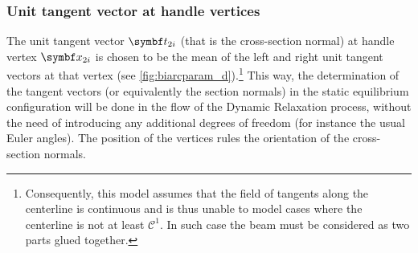 \subsubsection{Unit tangent vector at handle vertices}
The unit tangent vector $\vect{t}_{2i}$ (that is the cross-section normal) at handle vertex $\vect{x}_{2i}$ is chosen to be the mean of the left and right unit tangent vectors at that vertex (see \cref{fig:biarcparam_d}).\footnote{Consequently, this model assumes that the field of tangents along the centerline is continuous and is thus unable to model cases where the centerline is not at least $\mathcal{C}^1$. In such case the beam must be considered as two parts glued together.} This way, the determination of the tangent vectors (or equivalently the section normals) in the static equilibrium configuration will be done in the flow of the Dynamic Relaxation process, without the need of introducing any additional degrees of freedom (for instance the usual Euler angles). The position of the vertices rules the orientation of the cross-section normals.

